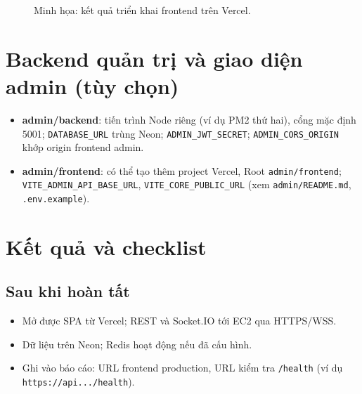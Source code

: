 \begin{figure}[H]
\centering
\caption{Minh họa: kết quả triển khai frontend trên Vercel.}
\label{fig:deploy-vercel-success}
\end{figure}

\section{Backend quản trị và giao diện admin (tùy chọn)}

\begin{itemize}
    \item \textbf{admin/backend}: tiến trình Node riêng (ví dụ PM2 thứ hai), cổng mặc định 5001; \texttt{DATABASE\_URL} trùng Neon; \texttt{ADMIN\_JWT\_SECRET}; \texttt{ADMIN\_CORS\_ORIGIN} khớp origin frontend admin.
    \item \textbf{admin/frontend}: có thể tạo thêm project Vercel, Root \texttt{admin/frontend}; \texttt{VITE\_ADMIN\_API\_BASE\_URL}, \texttt{VITE\_CORE\_PUBLIC\_URL} (xem \texttt{admin/README.md}, \texttt{.env.example}).
\end{itemize}

\section{Kết quả và checklist}

\subsection{Sau khi hoàn tất}

\begin{itemize}
    \item Mở được SPA từ Vercel; REST và Socket.IO tới EC2 qua HTTPS/WSS.
    \item Dữ liệu trên Neon; Redis hoạt động nếu đã cấu hình.
    \item Ghi vào báo cáo: URL frontend production, URL kiểm tra \texttt{/health} (ví dụ \texttt{https://api.../health}).
\end{itemize}

